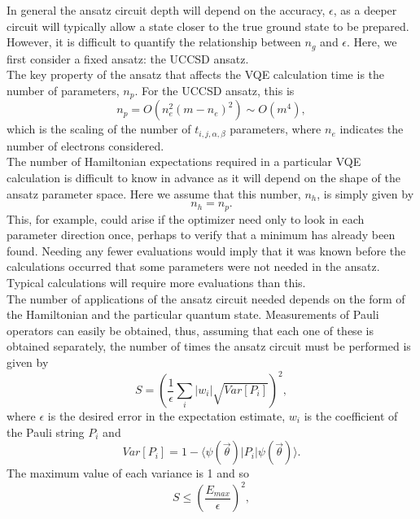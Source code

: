 In general the ansatz circuit depth will depend on the accuracy, $\epsilon$, as a deeper circuit will typically allow a state closer to the true ground state to be prepared. However, it is difficult to quantify the relationship between $n_g$ and $\epsilon$. Here, we first consider a fixed ansatz: the UCCSD ansatz. \\
The key property of the ansatz that affects the VQE calculation time is the number of parameters, $n_p$. For the UCCSD ansatz, this is
\begin{equation}
    n_p = O(n_e^2 (m - n_e)^2) \sim O(m^4),
\end{equation}
which is the scaling of the number of $t_{i,j,\alpha,\beta}$ parameters, where $n_e$ indicates the number of electrons considered. \\
The number of Hamiltonian expectations required in a particular VQE calculation is difficult to know in advance as it will depend on the shape of the ansatz parameter space. Here we assume that this number, $n_h$, is simply given by
\begin{equation}
    n_h = n_p.
\end{equation}
This, for example, could arise if the optimizer need only to look in each parameter direction once, perhaps to verify that a minimum has already been found. Needing any fewer evaluations would imply that it was known before the calculations occurred that some parameters were not needed in the ansatz. Typical calculations will require more evaluations than this. \\
The number of applications of the ansatz circuit needed depends on the form of the Hamiltonian and the particular quantum state. Measurements of Pauli operators can easily be obtained, thus, assuming that each one of these is obtained separately, the number of times the ansatz circuit must be performed is given by
\begin{equation}
    S = \left( \frac{1}{\epsilon} \sum_i |w_i| \sqrt{Var[P_i]} \right)^2, \label{number of measurements}
\end{equation}
where $\epsilon$ is the desired error in the expectation estimate, $w_i$ is the coefficient of the Pauli string $P_i$ and
\begin{equation}
    Var[P_i] = 1 - \langle \psi(\vec{\theta}) |P_i| \psi(\vec{\theta}) \rangle.
\end{equation}
The maximum value of each variance is 1 and so
\begin{equation}
    S \leq \left( \frac{E_{max}}{\epsilon} \right)^2,
\end{equation}
